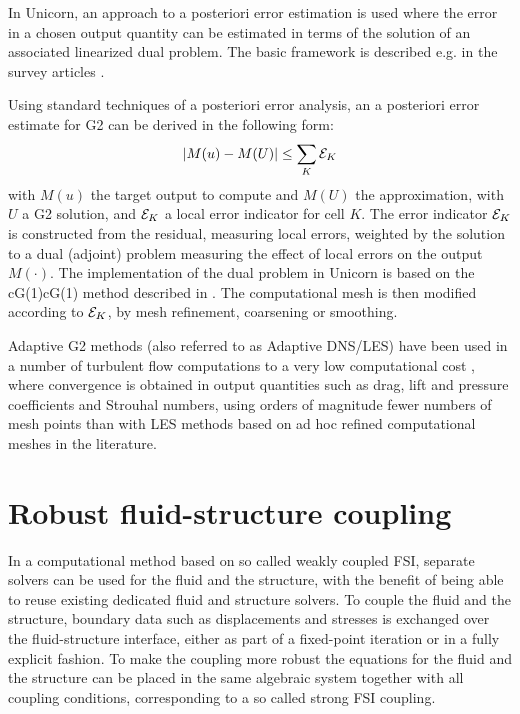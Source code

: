 In Unicorn, an approach to a posteriori error estimation is used where the error in a chosen output quantity can be estimated in terms of the solution of an associated linearized dual problem. The basic framework is described e.g. in the survey articles \cite{ErikssonEstepEtAl1995,BeckerRannacher2001,GilesSuli2002}.

Using standard techniques of a posteriori error analysis, an a posteriori error estimate for G2 can be derived in the following form:
\begin{equation}
\vert M(u) - M(U) \vert \leq \sum_K {\cal E}_K
\end{equation}
with $M(u)$ the target output to compute and $M(U)$ the approximation, with $U$ a G2 solution, and ${\cal E}_K$ a local error indicator for cell $K$.
The error indicator ${\cal E}_K$ is constructed from the residual, measuring local errors,
weighted by the solution to a dual (adjoint) problem measuring the effect of local errors
on the output $M(\cdot)$. The implementation of the dual problem in Unicorn is based on the cG(1)cG(1) method described in \cite{HoffmanJohnson2007}. The computational mesh is then modified according to $ {\cal E}_K$, by mesh refinement, coarsening or smoothing.

Adaptive G2 methods (also referred to as Adaptive DNS/LES) have been used in a number of turbulent flow computations to a very low computational cost \cite{Hoffman2005,HoffmanJohnson2006b,Hoffman2006,Hoffman2009,HoffmanJansson2009,VilelaJanssonEtAl2010}, where convergence is obtained in output quantities such as drag, lift and pressure coefficients and Strouhal numbers, using orders of magnitude fewer numbers of mesh points than with LES methods based on ad hoc refined computational meshes in the literature.

\section{Robust fluid-structure coupling}

In a computational method based on so called weakly coupled FSI, separate solvers can be used for the fluid and the structure, with the benefit of being able to reuse existing dedicated fluid and structure solvers. To couple the fluid and the structure, boundary data such as displacements and stresses is exchanged over the fluid-structure interface, either as part of a fixed-point iteration or in a fully explicit fashion. To make the coupling more robust the equations for the fluid and the structure can be placed in the same algebraic system together with all coupling conditions, corresponding to a so called strong FSI coupling.

